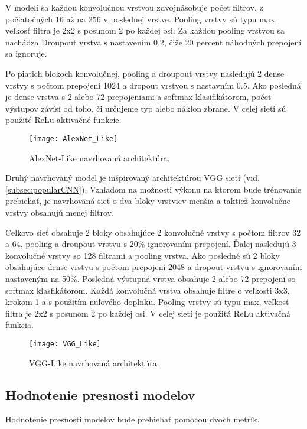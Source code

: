 V modeli sa každou konvolučnou vrstvou zdvojnásobuje počet filtrov, z počiatočných 16 až na 256 v poslednej vrstve.
Pooling vrstvy sú typu max, veľkosť filtra je 2x2 s posunom 2 po každej osi.
Za každou pooling vrstvou sa nachádza Droupout vrstva s nastavením 0.2, čiže 20 percent náhodných prepojení sa ignoruje.

Po piatich blokoch konvolučnej, pooling a droupout vrstvy nasledujú 2 dense vrstvy s počtom prepojení 1024 a dropout vrstvou s nastavním 0.5.
Ako posledná je dense vrstva s 2 alebo 72 prepojeniami a softmax klasifikátorom, počet výstupov závísí od toho, či určujeme typ alebo náklon zbrane.
V celej sietí sú použité ReLu aktivačné funkcie.

\begin{figure}[H]
    \centering
    \texttt{[image: AlexNet\_Like]}
    \caption{AlexNet-Like navrhovaná architektúra.}
    \label{pic:kNN}
\end{figure}


Druhý navrhovaný model je inšpirovaný architektúrou VGG sietí (viď. \ref{subsec:popularCNN}).
Vzhľadom na možnosti výkonu na ktorom bude trénovanie prebiehať, je navrhovaná sieť o dva bloky vrstviev menšia a taktiež konvolučne vrstvy obsahujú menej filtrov.

Celkovo sieť obsahuje 2 bloky obsahujúce 2 konvolučné vrstvy s počtom filtrov 32 a 64, pooling a droupout vrstvu s 20\% ignorovaním prepojení.
Ďalej nasledujú 3 konvolučné vrstvy so 128 filtrami a pooling vrstva.
Ako posledné sú 2 bloky obsahujúce dense vrstvu s počtom prepojení 2048 a dropout vrstvu s ignorovaním nastaveným na 50\%.
Posledná výstupná vrstva obsahuje 2 alebo 72 prepojení so softmax klasfikátorom.
Každá konvolučná vrstva obsahuje filtre o veľkosti 3x3, krokom 1 a s použitím nulového doplnku.
Pooling vrstvy sú typu max, veľkosť filtra je 2x2 s posunom 2 po každej osi.
V celej sietí je použitá ReLu aktivačná funkcia.

\begin{figure}[H]
    \centering
    \texttt{[image: VGG\_Like]}
    \caption{VGG-Like navrhovaná architektúra.}
    \label{pic:kNN}
\end{figure}

\subsection{Hodnotenie presnosti modelov}
\label{subsec:hodnoteniepresnosti}
Hodnotenie presnosti modelov bude prebiehať pomocou dvoch metrík.


